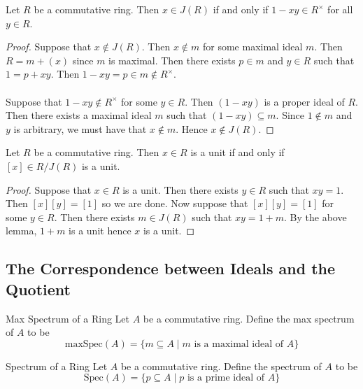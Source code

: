 \documentclass[a4paper]{article}
\begin{document}
\begin{lmm}{}{} Let $R$ be a commutative ring. Then $x\in J(R)$ if and only if $1-xy\in R^\times$ for all $y\in R$. \tcbline
\begin{proof}
Suppose that $x\notin J(R)$. Then $x\notin m$ for some maximal ideal $m$. Then $R=m+(x)$ since $m$ is maximal. Then there exists $p\in m$ and $y\in R$ such that $1=p+xy$. Then $1-xy=p\in m\notin R^\times$. \\~\\

Suppose that $1-xy\notin R^\times$ for some $y\in R$. Then $(1-xy)$ is a proper ideal of $R$. Then there exists a maximal ideal $m$ such that $(1-xy)\subseteq m$. Since $1\notin m$ and $y$ is arbitrary, we must have that $x\notin m$. Hence $x\notin J(R)$. 
\end{proof}
\end{lmm}

\begin{lmm}{}{} Let $R$ be a commutative ring. Then $x\in R$ is a unit if and only if $[x]\in R/J(R)$ is a unit. \tcbline
\begin{proof}
Suppose that $x\in R$ is a unit. Then there exists $y\in R$ such that $xy=1$. Then $[x][y]=[1]$ so we are done. Now suppose that $[x][y]=[1]$ for some $y\in R$. Then there exists $m\in J(R)$ such that $xy=1+m$. By the above lemma, $1+m$ is a unit hence $x$ is a unit. 
\end{proof}
\end{lmm}

\subsection{The Correspondence between Ideals and the Quotient}
\begin{defn}{Max Spectrum of a Ring}{} Let $A$ be a commutative ring. Define the max spectrum of $A$ to be $$\text{maxSpec}(A)=\{m\subseteq A\;|\;m\text{ is a maximal ideal of }A\}$$
\end{defn}

\begin{defn}{Spectrum of a Ring}{} Let $A$ be a commutative ring. Define the spectrum of $A$ to be $$\text{Spec}(A)=\{p\subseteq A\;|\;p\text{ is a prime ideal of }A\}$$
\end{defn}
\end{document}
